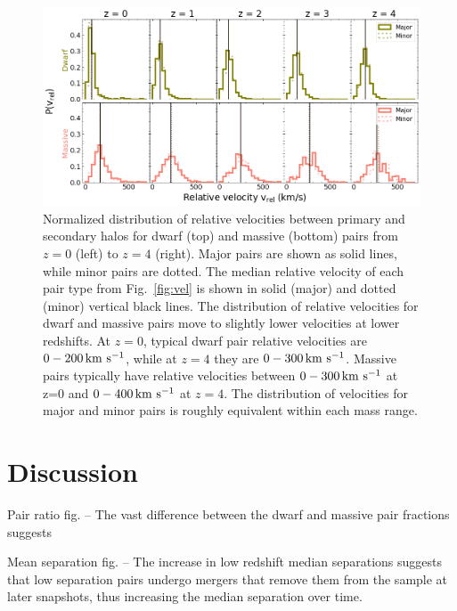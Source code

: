 \documentclass[twocolumn]{aastex631}
\begin{document}
\begin{figure}[htp]
  \centering
  \includegraphics[width=\textwidth]{veldist_1000.png}
  \caption{
  Normalized distribution of relative velocities between primary and secondary halos for dwarf (top) and massive (bottom) pairs from $z=0$ (left) to $z=4$ (right). Major pairs are shown as solid lines, while minor pairs are dotted. The median relative velocity of each pair type from Fig.~\ref{fig:vel} is shown in solid (major) and dotted (minor) vertical black lines. 
  The distribution of relative velocities for dwarf and massive pairs move to slightly lower velocities at lower redshifts. 
  At $z=0$, typical dwarf pair relative velocities are $0-200\,\mathrm{km}~\mathrm{s}^{-1}$, while at $z=4$ they are $0-300\,\mathrm{km}~\mathrm{s}^{-1}$. 
  Massive pairs typically have relative velocities between $0-300\,\mathrm{km}~\mathrm{s}^{-1}$ at z=0 and $0-400\,\mathrm{km}~\mathrm{s}^{-1}$ at $z=4$.
  The distribution of velocities for major and minor pairs is roughly equivalent within each mass range. 
    }
  \label{fig:vel-dist}
\end{figure}




\section{Discussion}
\label{sec:discussion}

Pair ratio fig. -- The vast difference between the dwarf and massive pair fractions suggests  

Mean separation fig. -- The increase in low redshift median separations suggests that low separation pairs undergo mergers that remove them from the sample at later snapshots, thus increasing the median separation over time.
\end{document}
